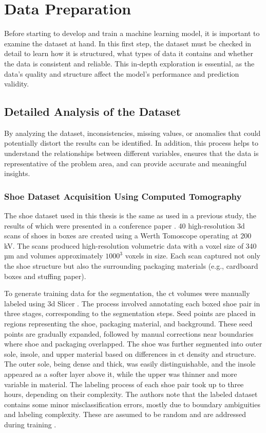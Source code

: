 \chapter{Data Preparation} \label{data_preparation}
Before starting to develop and train a machine learning model, it is important to examine the dataset at hand. In this first step, the dataset must be checked in detail to learn how it is structured, what types of data it contains and whether the data is consistent and reliable. This in‑depth exploration is essential, as the data's quality and structure affect the model's performance and prediction validity.


\section{Detailed Analysis of the Dataset}
By analyzing the dataset, inconsistencies, missing values, or anomalies that could potentially distort the results can be identified. In addition, this process helps to understand the relationships between different variables, ensures that the data is representative of the problem area, and can provide accurate and meaningful insights.


\subsection{Shoe Dataset Acquisition Using Computed Tomography}
The shoe dataset used in this thesis is the same as used in a previous study, the results of which were presented in a conference paper \cite{contribution_martin_leipert}. 40 high-resolution \gls{3d} scans of shoes in boxes are created using a Werth Tomoscope operating at 200\,kV. The scans produced high-resolution volumetric data with a voxel size of 340\,µm and volumes approximately $1000^3$ voxels in size. Each scan captured not only the shoe structure but also the surrounding packaging materials (e.g., cardboard boxes and stuffing paper). 

\medskip

To generate training data for the segmentation, the \gls{ct} volumes were manually labeled using \gls{3d} Slicer \cite{Fedorov_Slicer3D}. The process involved annotating each boxed shoe pair in three stages, corresponding to the segmentation steps. Seed points are placed in regions representing the shoe, packaging material, and background. These seed points are gradually expanded, followed by manual corrections near boundaries where shoe and packaging overlapped. The shoe was further segmented into outer sole, insole, and upper material based on differences in \gls{ct} density and structure. The outer sole, being dense and thick, was easily distinguishable, and the insole appeared as a softer layer above it, while the upper was thinner and more variable in material. The labeling process of each shoe pair took up to three hours, depending on their complexity. The authors note that the labeled dataset contains some minor misclassification errors, mostly due to boundary ambiguities and labeling complexity. These are assumed to be random and are addressed during training \cite{contribution_martin_leipert}.

